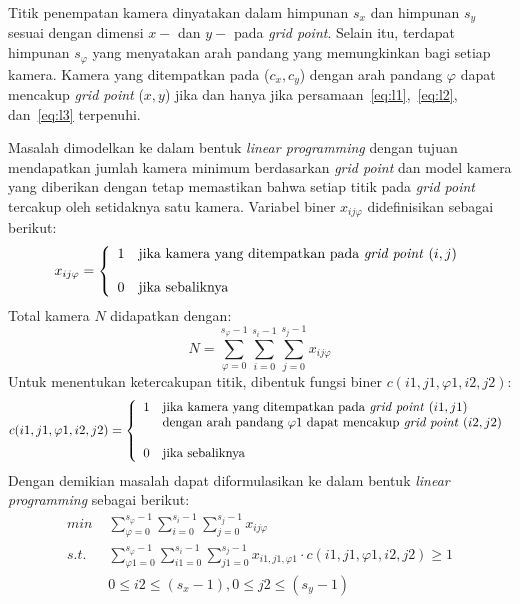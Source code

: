Titik penempatan kamera dinyatakan dalam himpunan \(s_x\) dan himpunan \(s_y\) sesuai dengan dimensi \(x-\) dan \(y-\) pada \textit{grid point}. Selain itu, terdapat himpunan \(s_\varphi\) yang menyatakan arah pandang yang memungkinkan bagi setiap kamera. Kamera yang ditempatkan pada (\(c_x,c_y\)) dengan arah pandang \(\varphi\) dapat mencakup \textit{grid point} (\(x,y\)) jika dan hanya jika persamaan~\ref{eq:l1},~\ref{eq:l2}, dan~\ref{eq:l3} terpenuhi.

Masalah dimodelkan ke dalam bentuk \textit{linear programming} dengan tujuan mendapatkan jumlah kamera minimum berdasarkan \textit{grid point} dan model kamera yang diberikan dengan tetap memastikan bahwa setiap titik pada \textit{grid point} tercakup oleh setidaknya satu kamera. Variabel biner \(x_{ij\varphi}\) didefinisikan sebagai berikut:
\begin{equation}
	x_{ij\varphi}=\left\{
		\begin{array}{cl}
			1 & \text{jika kamera yang ditempatkan pada \textit{grid point} }(i,j)\\\\
			0 & \text{jika sebaliknya}
		\end{array}
	\right.
\end{equation}
Total kamera \(N\) didapatkan dengan:
\begin{equation}
	N=\sum_{\varphi=0}^{s_\varphi-1}\sum_{i=0}^{s_i-1}\sum_{j=0}^{s_j-1}x_{ij\varphi}
\end{equation}
Untuk menentukan ketercakupan titik, dibentuk fungsi biner \(c(i1,j1,\varphi1,i2,j2)\):
\begin{equation}
	c(i1,j1,\varphi1,i2,j2)=\left \{
		\begin{array}{cl}
			1 & \text{jika kamera yang ditempatkan pada \textit{grid point} }(i1,j1)\\
			 & \text{dengan arah pandang }\varphi{1}\text{ dapat mencakup \textit{grid point} }(i2,j2)\\\\
			 0 & \text{jika sebaliknya}
		\end{array}
	\right.
\end{equation}
Dengan demikian masalah dapat diformulasikan ke dalam bentuk \textit{linear programming} sebagai berikut:
\begin{equation}
	\begin{split}
		\textit{min } & \sum_{\varphi=0}^{s_\varphi-1}\sum_{i=0}^{s_i-1}\sum_{j=0}^{s_j-1}x_{ij\varphi}\\
		\textit{s.t. } & \sum_{\varphi{1}=0}^{s_\varphi-1}\sum_{i1=0}^{s_i-1}\sum_{j1=0}^{s_j-1}x_{i1,j1,\varphi{1}}\cdot c(i1,j1,\varphi1,i2,j2)\geq 1\\
		&0\leq i2\leq(s_x-1), 0\leq j2\leq(s_y-1)
	\end{split}
	\label{eq:lpformhorster}
\end{equation}
